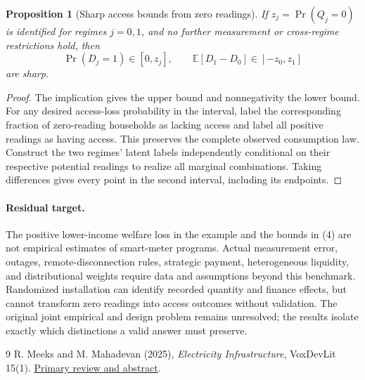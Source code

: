 \documentclass[11pt]{article}
\newtheorem{proposition}[theorem]{Proposition}
\theoremstyle{definition}
\begin{document}
\begin{proposition}[Sharp access bounds from zero readings]
If $z_j=\Pr(Q_j=0)$ is identified for regimes $j=0,1$, and no further measurement or cross-regime restrictions hold, then
\[
 \Pr(D_j=1)\in[0,z_j],\qquad
 \mathbb E[D_1-D_0]\in[-z_0,z_1]
 \tag{4}
\]
are sharp.
\end{proposition}
\begin{proof}
The implication gives the upper bound and nonnegativity the lower bound. For any desired access-loss probability in the interval, label the corresponding fraction of zero-reading households as lacking access and label all positive readings as having access. This preserves the complete observed consumption law. Construct the two regimes' latent labels independently conditional on their respective potential readings to realize all marginal combinations. Taking differences gives every point in the second interval, including its endpoints.
\end{proof}

\paragraph{Residual target.}
The positive lower-income welfare loss in the example and the bounds in (4) are not empirical estimates of smart-meter programs. Actual measurement error, outages, remote-disconnection rules, strategic payment, heterogeneous liquidity, and distributional weights require data and assumptions beyond this benchmark. Randomized installation can identify recorded quantity and finance effects, but cannot transform zero readings into access outcomes without validation. The original joint empirical and design problem remains unresolved; the results isolate exactly which distinctions a valid answer must preserve.

\begin{thebibliography}{9}
 R. Meeks and M. Mahadevan (2025), \emph{Electricity Infrastructure}, VoxDevLit 15(1). \href{https://voxdev.org/voxdevlit/electricity-infrastructure}{Primary review and abstract}.
\end{thebibliography}
\end{document}
